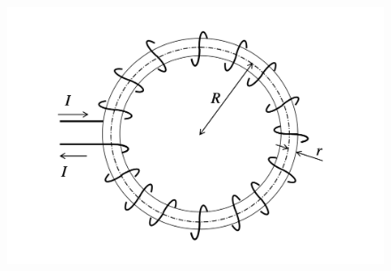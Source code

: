 \documentclass[dvipdfmx]{ujarticle}
\begin{document}
\begin{figure}[h]
	\centering
	\includegraphics[scale=0.35]{./fig/R03_fig3.png}
	\caption{}
	\label{fig:3}
\end{figure}

\newpage
\end{document}
